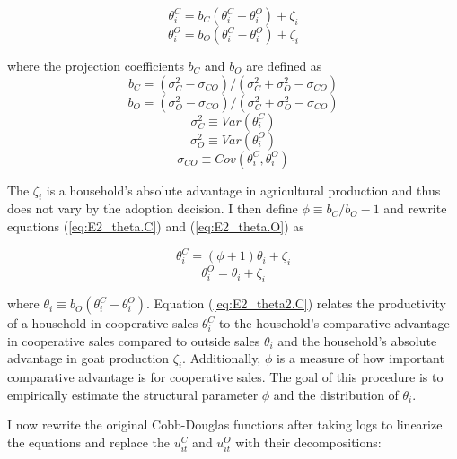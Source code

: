 \documentclass[11pt]{article}
\begin{document}
\begin{equation} \label{eq:E2_theta.C}
    \theta^{C}_{i} = b_{C}(\theta^{C}_{i} - \theta^{O}_{i}) + \zeta_{i}
\end{equation}
\begin{equation} \label{eq:E2_theta.O}
    \theta^{O}_{i} = b_{O}(\theta^{C}_{i} - \theta^{O}_{i}) + \zeta_{i}
\end{equation}

where the projection coefficients $b_{C}$ and $b_{O}$ are defined as \singlespacing
$$b_{C} = (\sigma^{2}_{C} - \sigma_{CO}) / (\sigma^{2}_{C} + \sigma^{2}_{O} - \sigma_{CO})$$ 
$$b_{O} = (\sigma^{2}_{O} - \sigma_{CO}) / (\sigma^{2}_{C} + \sigma^{2}_{O} - \sigma_{CO})$$
$$\sigma^{2}_{C} \equiv Var(\theta^{C}_{i})$$
$$\sigma^{2}_{O} \equiv Var(\theta^{O}_{i})$$
$$\sigma_{CO} \equiv Cov(\theta^{C}_{i},\theta^{O}_{i})$$
\doublespacing

The $\zeta_{i}$ is a household’s absolute advantage in agricultural production and thus does not vary by the adoption decision.
I then define $\phi \equiv b_C / b_O - 1$ and rewrite equations (\ref{eq:E2_theta.C}) and (\ref{eq:E2_theta.O}) as

\begin{equation} \label{eq:E2_theta2.C}
    \theta^{C}_{i} = (\phi + 1)\theta_{i} + \zeta_i
\end{equation}
\begin{equation} \label{eq:E2_theta2.O}
    \theta^{O}_{i} = \theta_{i} + \zeta_i
\end{equation}

where $\theta_{i} \equiv b_{O}(\theta^{C}_{i} - \theta^{O}_{i})$. Equation (\ref{eq:E2_theta2.C}) relates the productivity of a household in cooperative sales $\theta^{C}_{i}$ to the household’s comparative advantage in cooperative sales compared to outside sales $\theta_{i}$ and the household’s absolute advantage in goat production $\zeta_i$. Additionally, $\phi$ is a measure of how important comparative advantage is for cooperative sales. The goal of this procedure is to empirically estimate the structural parameter $\phi$ and the distribution of $\theta_{i}$.

I now rewrite the original Cobb-Douglas functions after taking logs to linearize the equations and replace the $u^{C}_{it}$ and $u^{O}_{it}$ with their decompositions:
\end{document}
